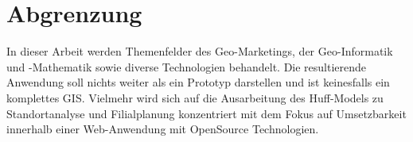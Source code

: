 \section{Abgrenzung}
In dieser Arbeit werden Themenfelder des Geo-Marketings, der Geo-Informatik und -Mathematik sowie diverse Technologien behandelt. 
Die resultierende Anwendung soll nichts weiter als ein Prototyp darstellen und ist keinesfalls ein komplettes GIS. 
Vielmehr wird sich auf die Ausarbeitung des Huff-Models zu Standortanalyse und Filialplanung konzentriert mit dem Fokus auf Umsetzbarkeit innerhalb einer Web-Anwendung mit OpenSource Technologien. 